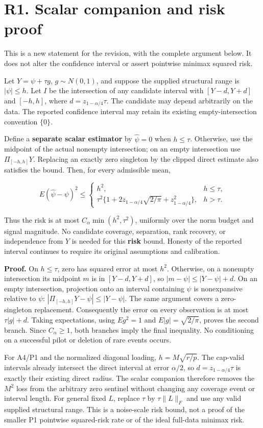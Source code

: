 \section{R1. Scalar companion and risk
proof}\label{r1.-scalar-companion-and-risk-proof}\label{sup:R1}

This is a new statement for the revision, with the complete argument
below. It does not alter the confidence interval or assert pointwise
minimax squared risk.

Let \(Y=\psi+\tau g\), \(g\sim N(0,1)\), and suppose the supplied
structural range is \(|\psi|\le h\). Let \(I\) be the intersection of
any candidate interval with \([Y-d,Y+d]\) and \([-h,h]\), where
\(d=z_{1-\alpha/4}\tau\). The candidate may depend arbitrarily on the
data. The reported confidence interval may retain its existing
empty-intersection convention \(\{0\}\).

Define a \textbf{separate scalar estimator} by \(\widehat\psi=0\) when
\(h\le\tau\). Otherwise, use the midpoint of the actual nonempty
intersection; on an empty intersection use \(\Pi_{[-h,h]}Y\). Replacing
an exactly zero singleton by the clipped direct estimate also satisfies
the bound. Then, for every admissible mean,

\[E(\widehat\psi-\psi)^2\le
\begin{cases}
h^2,&h\le\tau,\\
\tau^2\{1+2z_{1-\alpha/4}\sqrt{2/\pi}+z_{1-\alpha/4}^2\},&h>\tau.
\end{cases}\]

Thus the risk is at most \(C_\alpha\min(h^2,\tau^2)\), uniformly over
the norm budget and signal magnitude. No candidate coverage, separation,
rank recovery, or independence from \(Y\) is needed for this
\textbf{risk} bound. Honesty of the reported interval continues to
require its original assumptions and calibration.

\textbf{Proof.} On \(h\le\tau\), zero has squared error at most \(h^2\).
Otherwise, on a nonempty intersection its midpoint \(m\) is in
\([Y-d,Y+d]\), so \(|m-\psi|\le|Y-\psi|+d\). On an empty intersection,
projection onto an interval containing \(\psi\) is nonexpansive relative
to \(\psi\): \(|\Pi_{[-h,h]}Y-\psi|\le|Y-\psi|\). The same argument
covers a zero-singleton replacement. Consequently the error on every
observation is at most \(\tau|g|+d\). Taking expectations, using
\(Eg^2=1\) and \(E|g|=\sqrt{2/\pi}\), proves the second branch. Since
\(C_\alpha\ge1\), both branches imply the final inequality. No
conditioning on a successful pilot or deletion of rare events occurs.

For A4/P1 and the normalized diagonal loading, \(h=M\sqrt{r/p}\). The
cap-valid intervals already intersect the direct interval at error
\(\alpha/2\), so \(d=z_{1-\alpha/4}\tau\) is exactly their existing
direct radius. The scalar companion therefore removes the \(M^2\) loss
from the arbitrary zero sentinel without changing any coverage event or
interval length. For general fixed \(L\), replace \(\tau\) by
\(\tau\|L\|_F\) and use any valid supplied structural range. This is a
noise-scale risk bound, not a proof of the smaller P1 pointwise
squared-risk rate or of the ideal full-data minimax risk.

